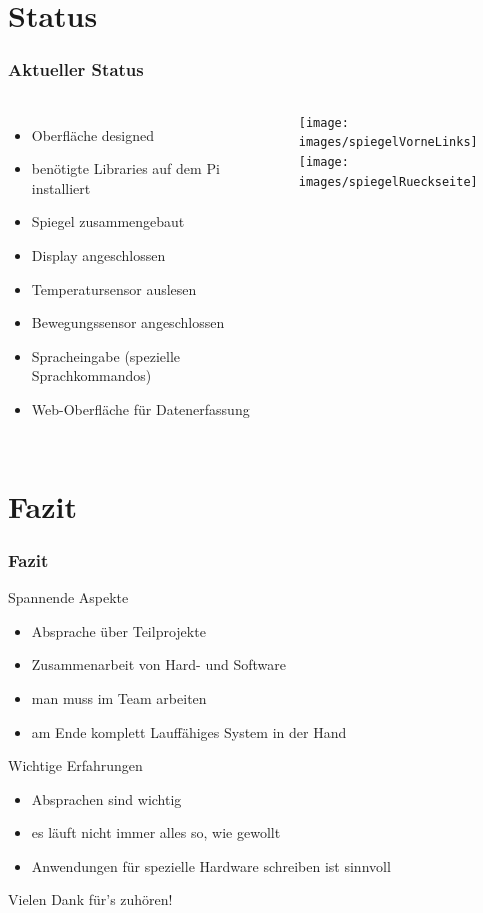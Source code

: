 \documentclass[11pt]{beamer}
\newcommand{\cmark}{\ding{51}}%
\newcommand{\xmark}{\ding{55}}%
\begin{document}
	\section{Status}
	\begin{frame}
		\frametitle{Aktueller Status}
			\begin{columns}
				\column{.5\paperwidth}
					\begin{itemize}
						\item[\cmark] Oberfl\"ache designed
						\item[\cmark] ben\"otigte Libraries auf dem Pi installiert
						\item[\cmark] Spiegel zusammengebaut
						\item[\cmark] Display angeschlossen
						\item[\xmark] Temperatursensor auslesen
						\item[\xmark] Bewegungssensor angeschlossen
						\item Spracheingabe (spezielle Sprachkommandos)
						\item Web-Oberfl\"ache f\"ur Datenerfassung
					\end{itemize}
				\column{.4\paperwidth}
					\texttt{[image: images/spiegelVorneLinks]}\\
					\vspace{.3cm}
					\texttt{[image: images/spiegelRueckseite]}
			\end{columns}
	\end{frame}
	
	\section{Fazit}
	\begin{frame}
		\frametitle{Fazit}
		\centering
		\begin{block}{Spannende Aspekte}
			\begin{itemize}
				\item Absprache \"uber Teilprojekte
				\item Zusammenarbeit von Hard- und Software
				\item man muss im Team arbeiten
				\item am Ende komplett Lauff\"ahiges System in der Hand
			\end{itemize}
		\end{block}
		\pause
		\begin{block}{Wichtige Erfahrungen}
			\begin{itemize}
				\item Absprachen sind wichtig
				\item es l\"auft nicht immer alles so, wie gewollt
				\item Anwendungen f\"ur spezielle Hardware schreiben ist sinnvoll
			\end{itemize}
		\end{block}
	\end{frame}
	\begin{frame}
		\huge
		\begin{center}
			\vfill
			Vielen Dank für's zuhören!
			\vfill
		\end{center}
	\end{frame}
\end{document}
